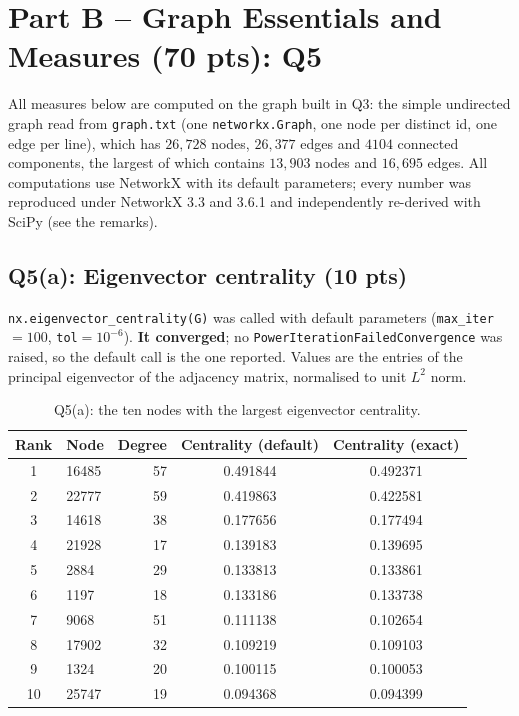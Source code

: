 \section*{Part B -- Graph Essentials and Measures (70 pts): Q5}

All measures below are computed on the graph built in Q3: the simple undirected
graph read from \texttt{graph.txt} (one \texttt{networkx.Graph}, one node per
distinct id, one edge per line), which has $26{,}728$ nodes, $26{,}377$ edges and
$4104$ connected components, the largest of which contains $13{,}903$ nodes and
$16{,}695$ edges. All computations use NetworkX with its default parameters; every
number was reproduced under NetworkX 3.3 and 3.6.1 and independently re-derived
with SciPy (see the remarks).

\subsection*{Q5(a): Eigenvector centrality (10 pts)}

\texttt{nx.eigenvector\_centrality(G)} was called with default parameters
(\texttt{max\_iter}$=100$, \texttt{tol}$=10^{-6}$). \textbf{It converged}; no
\texttt{PowerIterationFailedConvergence} was raised, so the default call is the
one reported. Values are the entries of the principal eigenvector of the adjacency
matrix, normalised to unit $L^2$ norm.

\begin{table}[H]
\centering
\begin{tabular}{clrcc}
\toprule
Rank & Node & Degree & Centrality (default) & Centrality (exact) \\
\midrule
1  & 16485 & 57 & 0.491844 & 0.492371 \\
2  & 22777 & 59 & 0.419863 & 0.422581 \\
3  & 14618 & 38 & 0.177656 & 0.177494 \\
4  & 21928 & 17 & 0.139183 & 0.139695 \\
5  & 2884  & 29 & 0.133813 & 0.133861 \\
6  & 1197  & 18 & 0.133186 & 0.133738 \\
7  & 9068  & 51 & 0.111138 & 0.102654 \\
8  & 17902 & 32 & 0.109219 & 0.109103 \\
9  & 1324  & 20 & 0.100115 & 0.100053 \\
10 & 25747 & 19 & 0.094368 & 0.094399 \\
\bottomrule
\end{tabular}
\caption{Q5(a): the ten nodes with the largest eigenvector centrality.}
\label{p3:tab:eig}
\end{table}

